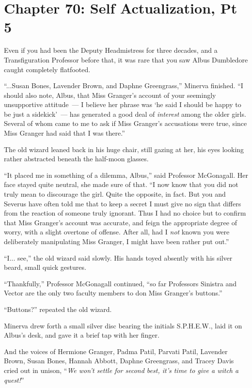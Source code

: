 \chapter{Chapter 70: Self Actualization, Pt 5}
Even if you had been the Deputy Headmistress for three decades, and a Transfiguration Professor before that, it was rare that you saw Albus Dumbledore caught completely flatfooted.

``...Susan Bones, Lavender Brown, and Daphne Greengrass,'' Minerva finished. ``I should also note, Albus, that Miss Granger's account of your seemingly unsupportive attitude~--- I believe her phrase was `he said I should be happy to be just a sidekick'~--- has generated a good deal of \emph{interest} among the older girls. Several of whom came to me to ask if Miss Granger's accusations were true, since Miss Granger had said that I was there.''

The old wizard leaned back in his huge chair, still gazing at her, his eyes looking rather abstracted beneath the half-moon glasses.

``It placed me in something of a dilemma, Albus,'' said Professor McGonagall. Her face stayed quite neutral, she made sure of that. ``I now know that you did not truly mean to discourage the girl. Quite the opposite, in fact. But you and Severus have often told me that to keep a secret I must give no sign that differs from the reaction of someone truly ignorant. Thus I had no choice but to confirm that Miss Granger's account was accurate, and feign the appropriate degree of worry, with a slight overtone of offense. After all, had I \emph{not} known you were deliberately manipulating Miss Granger, I might have been rather put out.''

``I... see,'' the old wizard said slowly. His hands toyed absently with his silver beard, small quick gestures.

``Thankfully,'' Professor McGonagall continued, ``so far Professors Sinistra and Vector are the only two faculty members to don Miss Granger's buttons.''

``Buttons?'' repeated the old wizard.

Minerva drew forth a small silver disc bearing the initials S.P.H.E.W., laid it on Albus's desk, and gave it a brief tap with her finger.

And the voices of Hermione Granger, Padma Patil, Parvati Patil, Lavender Brown, Susan Bones, Hannah Abbott, Daphne Greengrass, and Tracey Davis cried out in unison, ``\emph{We won't settle for second best, it's time to give a witch a quest!}''

